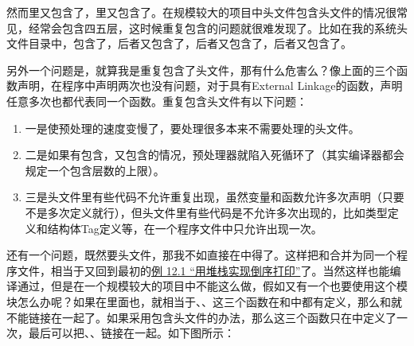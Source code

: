 

然而里又包含了，里又包含了。在规模较大的项目中头文件包含头文件的情况很常见，经常会包含四五层，这时候重复包含的问题就很难发现了。比如在我的系统头文件目录中，包含了，后者又包含了，后者又包含了，后者又包含了。



另外一个问题是，就算我是重复包含了头文件，那有什么危害么？像上面的三个函数声明，在程序中声明两次也没有问题，对于具有External Linkage的函数，声明任意多次也都代表同一个函数。重复包含头文件有以下问题：


\begin{enumerate}

\item 一是使预处理的速度变慢了，要处理很多本来不需要处理的头文件。

\item 二是如果有包含，又包含的情况，预处理器就陷入死循环了（其实编译器都会规定一个包含层数的上限）。

\item 三是头文件里有些代码不允许重复出现，虽然变量和函数允许多次声明（只要不是多次定义就行），但头文件里有些代码是不允许多次出现的，比如类型定义和结构体Tag定义等，在一个程序文件中只允许出现一次。
\end{enumerate}


还有一个问题，既然要头文件，那我不如直接在中得了。这样把和合并为同一个程序文件，相当于又回到最初的\hyperlink{db.ch12s02.id2749908}{例 12.\BookSplit{}1 “用堆栈实现倒序打印”}了。当然这样也能编译通过，但是在一个规模较大的项目中不能这么做，假如又有一个也要使用这个模块怎么办呢？如果在里面也，就相当于、、这三个函数在和中都有定义，那么和就不能链接在一起了。如果采用包含头文件的办法，那么这三个函数只在中定义了一次，最后可以把、、链接在一起。如下图所示：


